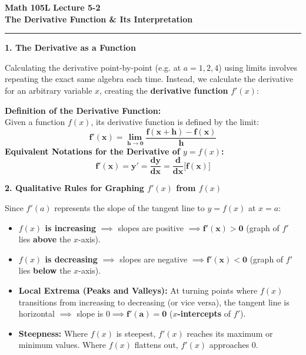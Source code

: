 \documentclass[10.5pt]{article}
\begin{document}
\noindent \textbf{\large Math 105L} \hfill \textbf{\large Lecture 5-2}\\[1pt]
{\textbf{\Large The Derivative Function \& Its Interpretation}}\\[-5pt]
\rule{\textwidth}{1.2pt}

\vspace{0.03in}

\textbf{\large 1. The Derivative as a Function}

Calculating the derivative point-by-point (e.g. at $a=1, 2, 4$) using limits involves repeating the exact same algebra each time. Instead, we calculate the derivative for an arbitrary variable $x$, creating the \textbf{derivative function} $f'(x)$:

\begin{tcolorbox}[colback=boxbg, colframe=boxframe, boxrule=0.8pt, arc=3pt, left=8pt, right=8pt, top=4pt, bottom=4pt]
\textbf{Definition of the Derivative Function:}\\[1pt]
Given a function $f(x)$, its derivative function is defined by the limit:
\[
  \mathbf{f'(x) = \lim_{h\to 0}\frac{f(x+h) - f(x)}{h}}
\]
\textbf{Equivalent Notations for the Derivative of $y = f(x)$:}
\[
  \mathbf{f'(x) = y' = \frac{dy}{dx} = \frac{d}{dx}\big[f(x)\big]}
\]
\end{tcolorbox}

\vspace{0.03in}

\textbf{\large 2. Qualitative Rules for Graphing $f'(x)$ from $f(x)$}

Since $f'(a)$ represents the slope of the tangent line to $y = f(x)$ at $x = a$:
\begin{itemize}[leftmargin=1.2em, topsep=1pt, itemsep=3pt]
  \item \textbf{$f(x)$ is increasing} $\implies$ slopes are positive $\implies \mathbf{f'(x) > 0}$ (graph of $f'$ lies \textbf{above} the $x$-axis).
  \item \textbf{$f(x)$ is decreasing} $\implies$ slopes are negative $\implies \mathbf{f'(x) < 0}$ (graph of $f'$ lies \textbf{below} the $x$-axis).
  \item \textbf{Local Extrema (Peaks and Valleys):} At turning points where $f(x)$ transitions from increasing to decreasing (or vice versa), the tangent line is horizontal $\implies$ slope is $0 \implies \mathbf{f'(a) = 0}$ (\textbf{$x$-intercepts} of $f'$).
  \item \textbf{Steepness:} Where $f(x)$ is steepest, $f'(x)$ reaches its maximum or minimum values. Where $f(x)$ flattens out, $f'(x)$ approaches $0$.
\end{itemize}
\end{document}

